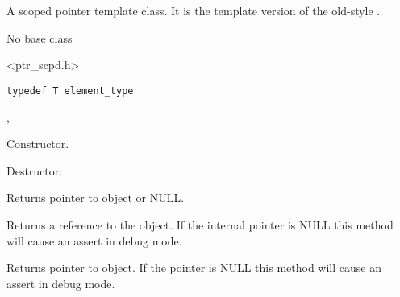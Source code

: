 \section{}\label{wxscopedptrtemplate}

A scoped pointer template class. It is the template version of
the old-style .


No base class


<ptr\_scpd.h>


{\small%
\begin{verbatim}
typedef T element_type
\end{verbatim}
}%


, 



\label{wxscopedptrtemplatewxscopedptrtemplate}


Constructor.

\label{wxscopedptrtemplatedtor}


Destructor.

\label{wxscopedptrtemplateget}


Returns pointer to object or NULL.

\label{wxscopedptrtemplateoperatorreft}


Returns a reference to the object. If the internal pointer is NULL
this method will cause an assert in debug mode.

\label{wxscopedptrtemplateoperatorderef}


Returns pointer to object. If the pointer is NULL this method will 
cause an assert in debug mode.

